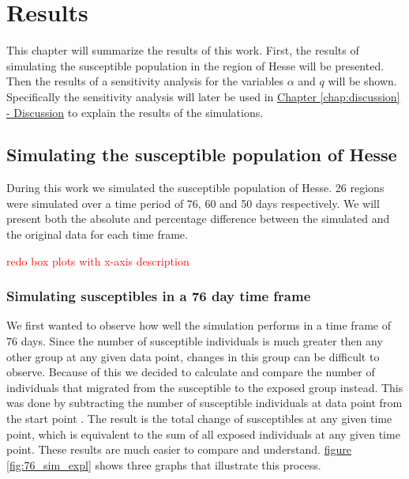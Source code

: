 
\chapter{Results} %
\label{chap:results} %
This chapter will summarize the results of this work. First, the results of simulating the susceptible population
in the region of Hesse will be presented. Then the results of a sensitivity analysis for the variables $\alpha$ and
$q$ will be shown. Specifically the sensitivity analysis will later be used in \hyperref[chap:discussion]{Chapter
\ref*{chap:discussion} - Discussion} to explain the results of the simulations.



\section{Simulating the susceptible population of Hesse}
During this work we simulated the susceptible population of Hesse. 26 regions were simulated over a time period of
76, 60 and 50 days respectively. We will present both the absolute and percentage difference between the simulated
and the original data for each time frame.

\textcolor{red}{redo box plots with x-axis description}

\subsection{Simulating susceptibles in a 76 day time frame}
We first wanted to observe how well the simulation performs in a time frame of 76 days. Since the number of susceptible
individuals is much greater then any other group at any given data point, changes in this group can be difficult to
observe. Because of this we decided to calculate and compare the number of individuals that migrated from the susceptible
to the exposed group instead. This was done by subtracting the number of susceptible individuals at data point  from
the start point . The result is the total change of susceptibles at any given time point, which is equivalent to the 
sum of all exposed individuals at any given time point. These results are much easier to compare and understand.
\hyperref[fig:76_sim_expl]{figure \ref*{fig:76_sim_expl}} shows three graphs that illustrate this process.


